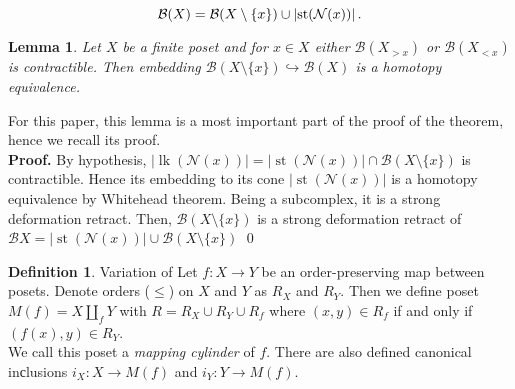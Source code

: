 \documentclass[english,12pt]{article}
\newcounter{stmcounter}[section]
\numberwithin{equation}{section}
\newtheorem{lemma}[stmcounter]{Lemma}
\theoremstyle{definition}
\newtheorem{definition}[stmcounter]{Definition}
\theoremstyle{remark}
\newenvironment{pf}{\noindent\textbf{Proof.}}{\qed}
\newcommand{\define}[1]{{\textit{#1}}}
\renewcommand{\leq}{\leqslant}
\begin{document}
\begin{equation}\label{covering}
  \mathcal{B}(X) = \mathcal{B}(X \setminus \{x\}) \cup \left|\operatorname{st}(\mathcal{N}(x))\right|.\\
\end{equation}

\begin{lemma}
  \label{lem:homotopy}
  Let $X$ be a finite poset and for $x \in X$ either $\mathcal{B}(X_{>x})$ or $\mathcal{B}(X_{<x})$ is contractible. Then embedding $\mathcal{B}(X \setminus \{x\}) \hookrightarrow \mathcal{B}(X)$ is a homotopy equivalence.
\end{lemma}

For this paper, this lemma is a most important part of the proof of the theorem, hence we recall its proof.\\

\begin{pf}
  By hypothesis, $\left|\operatorname{lk}(\mathcal{N}(x))\right| = \left|\operatorname{st}(\mathcal{N}(x))\right| \cap \mathcal{B}(X \setminus \{x\})$ is contractible. Hence its embedding to its cone $\left|\operatorname{st}(\mathcal{N}(x))\right|$ is a homotopy equivalence by Whitehead theorem. Being a subcomplex, it is a strong deformation retract. Then, $\mathcal{B}(X \setminus \{x\})$ is a strong deformation retract of $\mathcal{B}X = \left|\operatorname{st}(\mathcal{N}(x))\right| \cup \mathcal{B}(X \setminus \{x\})$
\end{pf}

\begin{definition} {Variation of \cite[Proposition 2.1]{Bar11}}
  Let $f : X \to Y$ be an order-preserving map between posets. Denote orders ($\leq$) on $X$ and $Y$ as $R_X$ and $R_Y$. Then we define poset $M(f) = X \coprod_f Y$ with $R = R_X \cup R_Y \cup R_{f}$ where $(x,y) \in R_f$ if and only if $(f(x),y) \in R_Y$.\\

  We call this poset a \define{mapping cylinder} of $f$. There are also defined canonical inсlusions $i_X : X \to M(f)$ and $i_Y : Y \to M(f)$.
\end{definition}
\end{document}
